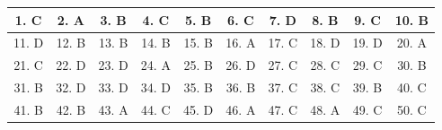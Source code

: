 \documentclass[12pt,a4paper]{article}
\begin{document}
\begin{center}\begin{tabular}{|c|c|c|c|c|c|c|c|c|c|}
\hline
1. C & 2. A & 3. B & 4. C & 5. B & 6. C & 7. D & 8. B & 9. C & 10. B\\\hline
11. D & 12. B & 13. B & 14. B & 15. B & 16. A & 17. C & 18. D & 19. D & 20. A\\\hline
21. C & 22. D & 23. D & 24. A & 25. B & 26. D & 27. C & 28. C & 29. C & 30. B\\\hline
31. B & 32. D & 33. D & 34. D & 35. B & 36. B & 37. C & 38. C & 39. B & 40. C\\\hline
41. B & 42. B & 43. A & 44. C & 45. D & 46. A & 47. C & 48. A & 49. C & 50. C\\\hline
\end{tabular}\end{center}
\end{document}

